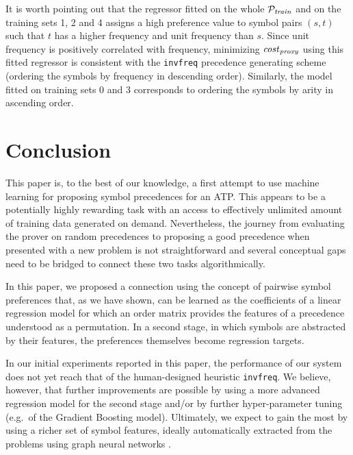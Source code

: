 \documentclass{ceurart}
\begin{document}
%	
%	

It is worth pointing out that the regressor fitted on the whole \(\mathcal{P}_{\mathit{train}}\)
and on the training sets 1, 2 and 4
assigns a high preference value to symbol pairs \((s, t)\)
such that \(t\) has a higher frequency and unit frequency than \(s\).
Since unit frequency is positively correlated with frequency,
minimizing \(\operatorname{\mathit{\operatorname{\mathit{cost}}_{proxy}}}\) using this fitted regressor
is consistent with the \texttt{invfreq} precedence generating scheme
(ordering the symbols by frequency in descending order).
Similarly, the model fitted on training sets 0 and 3 corresponds to ordering the symbols by arity in ascending order.

\section{Conclusion}

This paper is, to the best of our knowledge, a first attempt to use machine learning for proposing symbol precedences for an ATP. 
This appears to be a potentially highly rewarding task with an access to effectively unlimited amount of training data generated on demand.
Nevertheless, the journey from evaluating the prover on random precedences to proposing a good precedence when presented 
with a new problem is not straightforward and several conceptual gaps need to be bridged to connect these two tasks algorithmically. 

In this paper, we proposed a connection using the concept of pairwise symbol preferences that, as we have shown,
can be learned as the coefficients of a linear regression model for 
which an order matrix provides the features of a precedence understood as a permutation. 
In a second stage, in which symbols are abstracted by their features, the preferences themselves become regression targets.

In our initial experiments reported in this paper, the performance of our system does not
yet reach that of the human-designed heuristic \texttt{invfreq}. We believe, however,
that further improvements are possible by using a more advanced regression model for the second stage
and/or by further hyper-parameter tuning (e.g.~of the Gradient Boosting model).
Ultimately, we expect to gain the most by using a richer set of symbol features,
ideally automatically extracted from the problems using graph neural networks \cite{Wu2019}. 
\end{document}
